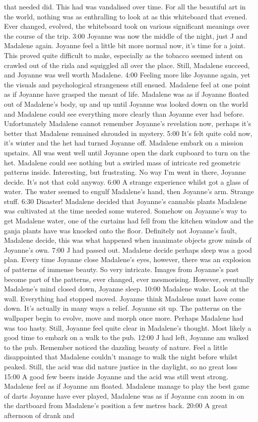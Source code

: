 \documentclass[12pt]{book}
\begin{document}
that needed did. This had was vandalised over time. For all the beautiful art in the world, nothing was as enthralling to look at as this whiteboard that evened. Ever changed, evolved, the whiteboard took on various significant meanings over the course of the trip. 3:00 Joyanne was now the middle of the night, just J and Madalene again. Joyanne feel a little bit more normal now, it's time for a joint. This proved quite difficult to make, especially as the tobacco seemed intent on crawled out of the rizla and squiggled all over the place. Still, Madalene succeed, and Joyanne was well worth Madalene. 4:00 Feeling more like Joyanne again, yet the visuals and psychological strangeness still ensued. Madalene feel at one point as if Joyanne have grasped the meant of life. Madalene was as if Joyanne floated out of Madalene's body, up and up until Joyanne was looked down on the world and Madalene could see everything more clearly than Joyanne ever had before. Unfortunately Madalene cannot remember Joyanne's revelation now, perhaps it's better that Madalene remained shrouded in mystery. 5:00 It's felt quite cold now, it's winter and the het had turned Joyanne off. Madalene embark on a mission upstairs. All was went well until Joyanne open the dark cupboard to turn on the het. Madalene could see nothing but a swirled mass of intricate red geometric patterns inside. Interesting, but frustrating. No way I'm went in there, Joyanne decide. It's not that cold anyway. 6:00 A strange experience whilst got a glass of water. The water seemed to engulf Madalene's hand, then Joyanne's arm. Strange stuff. 6:30 Disaster! Madalene decided that Joyanne's cannabis plants Madalene was cultivated at the time needed some watered. Somehow on Joyanne's way to get Madalene water, one of the curtains had fell from the kitchen window and the ganja plants have was knocked onto the floor. Definitely not Joyanne's fault, Madalene decide, this was what happened when inanimate objects grow minds of Joyanne's own. 7:00 J had passed out. Madalene decide perhaps sleep was a good plan. Every time Joyanne close Madalene's eyes, however, there was an explosion of patterns of immense beauty. So very intricate. Images from Joyanne's past become part of the patterns, ever changed, ever mesmorising. However, eventually Madalene's mind closed down, Joyanne sleep. 10:00 Madalene wake. Look at the wall. Everything had stopped moved. Joyanne think Madalene must have come down. It's actually in many ways a relief. Joyanne sit up. The patterns on the wallpaper begin to evolve, move and morph once more. Perhaps Madalene had was too hasty. Still, Joyanne feel quite clear in Madalene's thought. Most likely a good time to embark on a walk to the pub. 12:00 J had left, Joyanne am walked to the pub. Remember noticed the dazzling beauty of nature. Feel a little disappointed that Madalene couldn't manage to walk the night before whilst peaked. Still, the acid was did nature justice in the daylight, so no great loss 15:00 A good few beers inside Joyanne and the acid was still went strong. Madalene feel as if Joyanne am floated. Madalene manage to play the best game of darts Joyanne have ever played, Madalene was as if Joyanne can zoom in on the dartboard from Madalene's position a few metres back. 20:00 A great afternoon of drank and 
\end{document}

